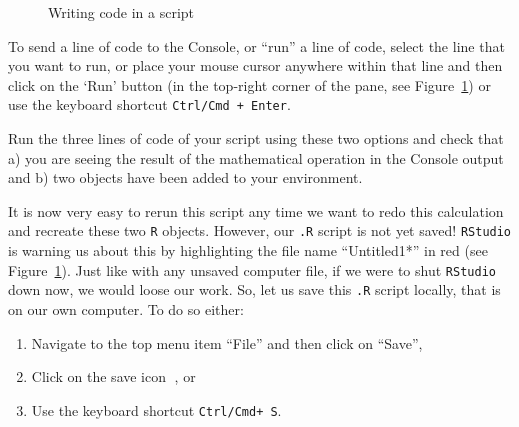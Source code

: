 \documentclass[
  letterpaper,
  DIV=11,
  numbers=noendperiod,
  oneside]{scrreprt}
\providecommand{\tightlist}{%
  \setlength{\itemsep}{0pt}\setlength{\parskip}{0pt}}\usepackage{longtable,booktabs,array}
\begin{document}
\begin{figure}


\caption{\label{fig-NewScript}Writing code in a script}

\end{figure}%

To send a line of code to the Console, or ``run'' a line of code, select
the line that you want to run, or place your mouse cursor anywhere
within that line and then click on the `Run' button (in the top-right
corner of the pane, see Figure~\ref{fig-NewScript}) or use the keyboard
shortcut \texttt{Ctrl/Cmd\ +\ Enter}.

Run the three lines of code of your script using these two options and
check that a) you are seeing the result of the mathematical operation in
the Console output and b) two objects have been added to your
environment.

It is now very easy to rerun this script any time we want to redo this
calculation and recreate these two \texttt{R} objects. However, our
\texttt{.R} script is not yet saved! \texttt{RStudio} is warning us
about this by highlighting the file name ``Untitled1*'' in red (see
Figure~\ref{fig-NewScript}). Just like with any unsaved computer file,
if we were to shut \texttt{RStudio} down now, we would loose our work.
So, let us save this \texttt{.R} script locally, that is on our own
computer. To do so either:

\begin{enumerate}
\def\labelenumi{\arabic{enumi}.}
\tightlist
\item
  Navigate to the top menu item ``File'' and then click on ``Save'',
\item
  Click on the save icon 💾, or
\item
  Use the keyboard shortcut \texttt{Ctrl/Cmd+\ S}.
\end{enumerate}
\end{document}
